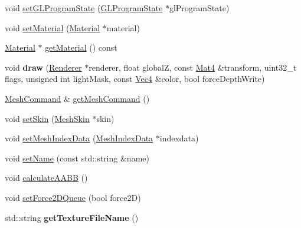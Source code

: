 \begin{DoxyCompactItemize}
\item 
void \hyperlink{classMesh_a0ed181ab96758bfef2c6836aad2d8f8c}{set\+G\+L\+Program\+State} (\hyperlink{classGLProgramState}{G\+L\+Program\+State} $\ast$gl\+Program\+State)
\item 
void \hyperlink{classMesh_acee71afee77988e9233bee788ac501f3}{set\+Material} (\hyperlink{classMaterial}{Material} $\ast$material)
\item 
\hyperlink{classMaterial}{Material} $\ast$ \hyperlink{classMesh_a848b58b9b1c49199da9fbc41b444be1d}{get\+Material} () const
\item 
\mbox{\label{classMesh_aac6b32ceb472188570a5fdfabdc84467}} 
void {\bfseries draw} (\hyperlink{classRenderer}{Renderer} $\ast$renderer, float globalZ, const \hyperlink{classMat4}{Mat4} \&transform, uint32\+\_\+t flags, unsigned int light\+Mask, const \hyperlink{classVec4}{Vec4} \&color, bool force\+Depth\+Write)
\item 
\hyperlink{classMeshCommand}{Mesh\+Command} \& \hyperlink{classMesh_a39c778124e07dc3e23613b78e9f717c4}{get\+Mesh\+Command} ()
\item 
void \hyperlink{classMesh_a5af01fd336373b86c3f3f092f7eb03ec}{set\+Skin} (\hyperlink{classMeshSkin}{Mesh\+Skin} $\ast$skin)
\item 
void \hyperlink{classMesh_ab9bbc073beb34fd8bd5b5b0f973a4fe2}{set\+Mesh\+Index\+Data} (\hyperlink{classMeshIndexData}{Mesh\+Index\+Data} $\ast$indexdata)
\item 
void \hyperlink{classMesh_ab944b018efbf265dc7555d793e50b4fd}{set\+Name} (const std\+::string \&name)
\item 
void \hyperlink{classMesh_aceba31e4566e9369d03a169c3742eb0f}{calculate\+A\+A\+BB} ()
\item 
void \hyperlink{classMesh_aac7eb18692391478f6bbb0a9937b86fd}{set\+Force2\+D\+Queue} (bool force2D)
\item 
\mbox{\label{classMesh_aabe0b489915c74fb8565c6aee2d62b77}} 
std\+::string {\bfseries get\+Texture\+File\+Name} ()
\end{DoxyCompactItemize}
